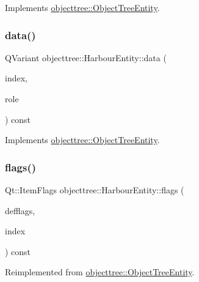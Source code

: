 Implements \mbox{\hyperlink{classobjecttree_1_1_object_tree_entity_a70fd25eccf88b305e9db15fbe3daeae8}{objecttree\+::\+Object\+Tree\+Entity}}.

\mbox{\label{classobjecttree_1_1_harbour_entity_aa18c43711523e417d5c7d1b71de2033f}} 
\subsubsection{\texorpdfstring{data()}{data()}}
{\footnotesize\ttfamily Q\+Variant objecttree\+::\+Harbour\+Entity\+::data (\begin{DoxyParamCaption}\item[{const Q\+Model\+Index \&}]{index,  }\item[{int}]{role }\end{DoxyParamCaption}) const\hspace{0.3cm}{\ttfamily [virtual]}}



Implements \mbox{\hyperlink{classobjecttree_1_1_object_tree_entity_a2413c6573de18b451d97eb3800f10f35}{objecttree\+::\+Object\+Tree\+Entity}}.

\mbox{\label{classobjecttree_1_1_harbour_entity_af7bd7bc6f18e5fe8f8fac7cdce4fbe21}} 
\subsubsection{\texorpdfstring{flags()}{flags()}}
{\footnotesize\ttfamily Qt\+::\+Item\+Flags objecttree\+::\+Harbour\+Entity\+::flags (\begin{DoxyParamCaption}\item[{Qt\+::\+Item\+Flags}]{defflags,  }\item[{const Q\+Model\+Index \&}]{index }\end{DoxyParamCaption}) const\hspace{0.3cm}{\ttfamily [virtual]}}



Reimplemented from \mbox{\hyperlink{classobjecttree_1_1_object_tree_entity_a71042bfb5a8328bcbde9d283c0b1b28c}{objecttree\+::\+Object\+Tree\+Entity}}.

